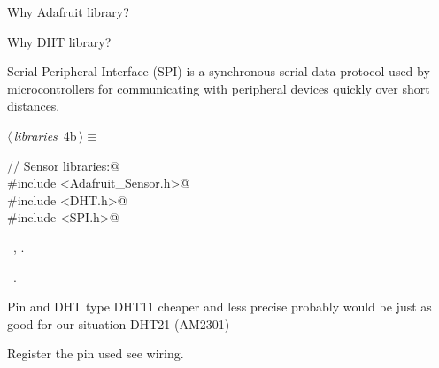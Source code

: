 \documentclass[a4paper, 12pt]{article}
\begin{document}
Why Adafruit library?

Why DHT library?

Serial Peripheral Interface (SPI) is a synchronous serial data protocol
used by microcontrollers for communicating with peripheral devices quickly over short distances.

\begin{flushleft} \small
\begin{minipage}{\linewidth}\label{scrap2}\raggedright\small
{}$\langle\,${\itshape libraries}\nobreak\ {\footnotesize{4b}}$\,\rangle\equiv$
\vspace{-1ex}
\begin{list}{}{\setlength{\leftmargin}{1em}} \item
\mbox{}\verb@// Sensor libraries:@\\
\mbox{}\verb@#include <Adafruit_Sensor.h>@\\
\mbox{}\verb@#include <DHT.h>@\\
\mbox{}\verb@#include <SPI.h>@\\
\mbox{}{\NWsep}
\end{list}
\vspace{-1ex}
\vspace{-1ex}
\footnotesize
\begin{list}{}{\setlength{\itemsep}{-\parsep}\setlength{\itemindent}{-\leftmargin}}
\item \NWtxtMacroDefBy\ , .
\item \NWtxtMacroRefIn\ .
\end{list}
\end{minipage}
\end{flushleft}

Pin and DHT type
DHT11 cheaper and less precise probably would be just as good for our situation
DHT21 (AM2301)

Register the pin used see wiring.
\end{document}
